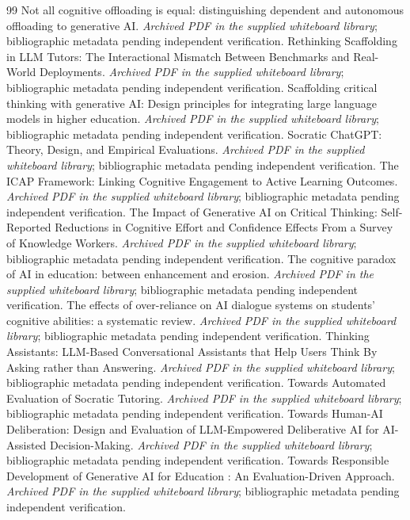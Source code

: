 \begin{thebibliography}{99}
 Not all cognitive offloading is equal: distinguishing dependent and autonomous offloading to generative AI. \emph{Archived PDF in the supplied whiteboard library}; bibliographic metadata pending independent verification.
 Rethinking Scaffolding in LLM Tutors: The Interactional Mismatch Between Benchmarks and Real-World Deployments. \emph{Archived PDF in the supplied whiteboard library}; bibliographic metadata pending independent verification.
 Scaffolding critical thinking with generative AI: Design principles for integrating large language models in higher education. \emph{Archived PDF in the supplied whiteboard library}; bibliographic metadata pending independent verification.
 Socratic ChatGPT: Theory, Design, and Empirical Evaluations. \emph{Archived PDF in the supplied whiteboard library}; bibliographic metadata pending independent verification.
 The ICAP Framework: Linking Cognitive Engagement to Active Learning Outcomes. \emph{Archived PDF in the supplied whiteboard library}; bibliographic metadata pending independent verification.
 The Impact of Generative AI on Critical Thinking: Self-Reported Reductions in Cognitive Effort and Confidence Effects From a Survey of Knowledge Workers. \emph{Archived PDF in the supplied whiteboard library}; bibliographic metadata pending independent verification.
 The cognitive paradox of AI in education: between enhancement and erosion. \emph{Archived PDF in the supplied whiteboard library}; bibliographic metadata pending independent verification.
 The effects of over-reliance on AI dialogue systems on students' cognitive abilities: a systematic review. \emph{Archived PDF in the supplied whiteboard library}; bibliographic metadata pending independent verification.
 Thinking Assistants: LLM-Based Conversational Assistants that Help Users Think By Asking rather than Answering. \emph{Archived PDF in the supplied whiteboard library}; bibliographic metadata pending independent verification.
 Towards Automated Evaluation of Socratic Tutoring. \emph{Archived PDF in the supplied whiteboard library}; bibliographic metadata pending independent verification.
 Towards Human-AI Deliberation: Design and Evaluation of LLM-Empowered Deliberative AI for AI-Assisted Decision-Making. \emph{Archived PDF in the supplied whiteboard library}; bibliographic metadata pending independent verification.
 Towards Responsible Development of Generative AI for Education : An Evaluation-Driven Approach. \emph{Archived PDF in the supplied whiteboard library}; bibliographic metadata pending independent verification.

\end{thebibliography}
